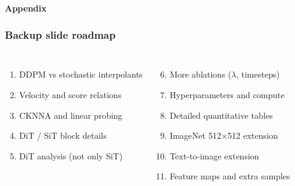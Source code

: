 
\begin{frame}[t]
  \framesubtitle{Appendix}
  \frametitle{Backup slide roadmap}
  \begin{columns}[T,totalwidth=\textwidth]
    \begin{enumerate}
      \item DDPM vs stochastic interpolants
      \item Velocity and score relations
      \item CKNNA and linear probing
      \item DiT / SiT block details
      \item DiT analysis (not only SiT)
    \end{enumerate}
    \begin{enumerate}\setcounter{enumi}{5}
      \item More ablations (\(\lambda\), timesteps)
      \item Hyperparameters and compute
      \item Detailed quantitative tables
      \item ImageNet 512\(\times\)512 extension
      \item Text-to-image extension
      \item Feature maps and extra samples
    \end{enumerate}
  \end{columns}
\end{frame}

